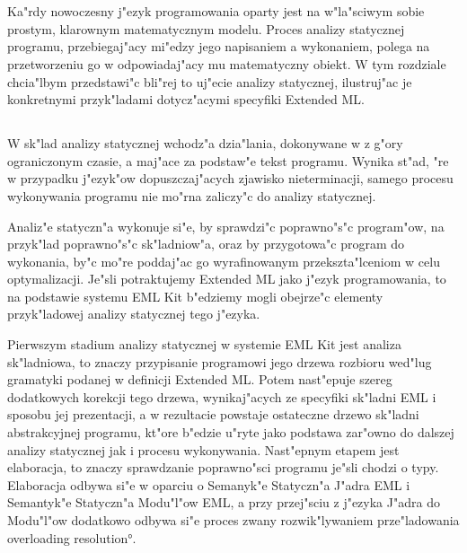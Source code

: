\section{\secanal}
\label{sec:anal}

Ka"rdy nowoczesny j"ezyk programowania oparty jest na w"la"sciwym sobie
prostym, klarownym matematycznym modelu.
Proces analizy statycznej programu, przebiegaj"acy mi"edzy jego napisaniem
a wykonaniem, polega na przetworzeniu go w odpowiadaj"acy mu matematyczny obiekt.
W tym rozdziale chcia"lbym przedstawi"c bli"rej to uj"ecie analizy statycznej,
ilustruj"ac je konkretnymi przyk"ladami dotycz"acymi specyfiki Extended ML.

\subsection{\secall}
\label{sec:all}

W sk"lad analizy statycznej wchodz"a dzia"lania, 
dokonywane w z g"ory ograniczonym czasie, a maj"ace za podstaw"e tekst programu.
Wynika st"ad, "re w przypadku j"ezyk"ow dopuszczaj"acych zjawisko nieterminacji,
samego procesu wykonywania programu nie mo"rna zaliczy"c do analizy statycznej.

Analiz"e statyczn"a wykonuje si"e, by sprawdzi"c poprawno"s"c program"ow,
na przyk"lad poprawno"s"c sk"ladniow"a, oraz by przygotowa"c program do wykonania,
by"c mo"re poddaj"ac go wyrafinowanym przekszta"lceniom w celu optymalizacji.
Je"sli potraktujemy Extended ML jako j"ezyk programowania,
to na podstawie systemu EML Kit b"edziemy mogli obejrze"c
elementy przyk"ladowej analizy statycznej tego j"ezyka.

Pierwszym stadium analizy statycznej w systemie EML Kit jest analiza sk"ladniowa, 
to znaczy przypisanie programowi jego drzewa rozbioru wed"lug gramatyki podanej w definicji Extended ML.
Potem nast"epuje szereg dodatkowych korekcji tego drzewa,
wynikaj"acych ze specyfiki sk"ladni EML i sposobu jej prezentacji,
a w rezultacie powstaje ostateczne drzewo sk"ladni abstrakcyjnej programu,
kt"ore b"edzie u"ryte jako podstawa zar"owno do dalszej 
analizy statycznej jak i procesu wykonywania.
Nast"epnym etapem jest elaboracja, to znaczy sprawdzanie 
poprawno"sci programu je"sli chodzi o typy.
Elaboracja odbywa si"e w oparciu o Semanyk"e Statyczn"a J"adra EML
i Semantyk"e Statyczn"a Modu"l"ow EML, a przy przej"sciu z j"ezyka
J"adra do Modu"l"ow dodatkowo odbywa si"e proces zwany
rozwik"lywaniem prze"ladowania \ang{overloading resolution}.
 
